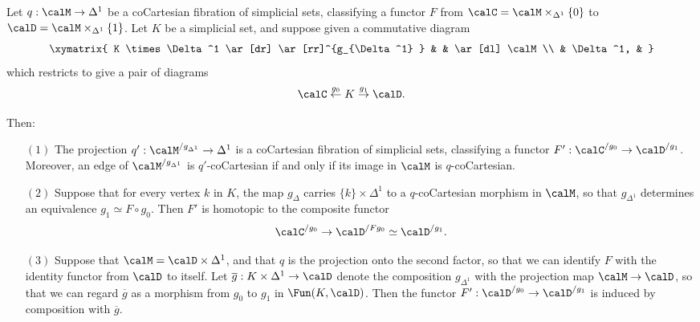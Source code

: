 \begin{lemma}\label{curtwell}
Let $q: \calM \rightarrow \Delta^1$ be a coCartesian fibration of simplicial sets, classifying a functor
$F$ from $\calC = \calM \times_{ \Delta^1 } \{0\}$ to $\calD = \calM \times_{ \Delta^1 } \{1\}$.
Let $K$ be a simplicial set, and suppose given a commutative diagram
$$ \xymatrix{ K \times \Delta^1 \ar[dr] \ar[rr]^{g_{\Delta^1} } & & 
\ar[dl] \calM \\
& \Delta^1, & }$$
which restricts to give a pair of diagrams
$$ \calC \stackrel{g_0}{\leftarrow} K \stackrel{g_1}{\rightarrow} \calD.$$
 
Then:
\begin{itemize}
\item[$(1)$] The projection $q': \calM^{/g_{\Delta^1}} \rightarrow 
\Delta^1$ is a coCartesian fibration of simplicial sets, classifying a 
functor $F': \calC^{/g_0} \rightarrow \calD^{/g_1}$. Moreover, an
edge of $\calM^{/ g_{\Delta^1} }$ is $q'$-coCartesian if and only if its image in 
$\calM$ is $q$-coCartesian.

\item[$(2)$] Suppose that for every vertex $k$ in $K$, the map 
$g_{\Delta}$ carries $\{ k\} \times \Delta^1$
to a $q$-coCartesian morphism in $\calM$, so that $g_{\Delta^1}$ 
determines an equivalence $g_1 \simeq F \circ g_0$. Then $F'$ is homotopic 
to the composite functor
$$ \calC^{/g_0} \rightarrow \calD^{/ Fg_0} \simeq \calD^{/ g_1}.$$

\item[$(3)$] Suppose that $\calM = \calD \times \Delta^1$, and that $q$ is 
the projection onto the second factor, so that we can identify $F$ with 
the identity functor from $\calD$ to itself. Let $\overline{g}: K \times 
\Delta^1 \rightarrow \calD$ 
denote the composition $g_{\Delta^1}$ with the projection map
$\calM \rightarrow \calD$, so that we can regard
$\overline{g}$ as a morphism from $g_0$ to $g_1$ in $\Fun(K, \calD)$. Then 
the functor $F': \calD^{/g_0} \rightarrow \calD^{/g_1}$ is induced by 
composition with $\overline{g}$.

\end{itemize}
\end{lemma}

